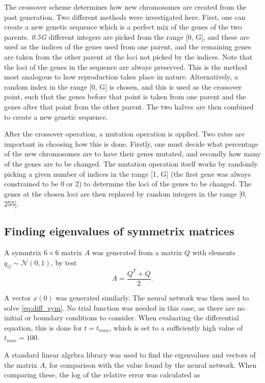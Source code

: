 \documentclass[multicolumn, 10pt]{extarticle}
\begin{document}
The crossover scheme determines how new chromosomes are created from the past generation. Two different methods were investigated here. First, one can create a new genetic sequence which is a perfect mix of the genes of the two parents. \textit{0.5G} different integers are picked from the range [0, G], and these are used as the indices of the genes used from one parent, and the remaining genes are taken from the other parent at the loci not picked by the indices. Note that the loci of the genes in the sequence are always preserved. This is the method most analogous to how reproduction takes place in nature. Alternatively, a random index in the range [0, G] is chosen, and this is used as the crossover point, such that the genes before that point is taken from one parent and the genes after that point from the other parent. The two halves are then combined to create a new genetic sequence.

After the crossover operation, a mutation operation is applied. Two rates are important in choosing how this is done. Firstly, one must decide what percentage of the new chromosomes are to have their genes mutated, and secondly how many of the genes are to be changed. The mutation operation itself works by randomly picking a given number of indices in the range [1, G] (the first gene was always constrained to be 0 or 2) to determine the loci of the genes to be changed. The genes at the chosen loci are then replaced by random integers in the range [0, 255].

\subsection{Finding eigenvalues of symmetrix matrices}
A symmtrix $6\times6$ matrix $A$ was generated from a matrix $Q$ with elements $q_{ij} \sim \mathcal{N}(0,1)$, by test
\begin{equation}\label{eq:symmat}
	A=\frac{Q^T+Q}{2}.
\end{equation}

A vector $x(0)$ was generated similarly. The neural network was then used to solve \eqref{eq:diff_sym}. No trial function was needed in this case, as there are no initial or boundary conditions to consider. When evaluating the differential equation, this is done for $t=t_{max}$, which is set to a sufficiently high value of $t_{max}=100$.

A standard linear algebra library was used to find the eigenvalues and vectors of the matrix $A$, for comparison with the value found by the neural network. When comparing these, the log of the relative error was calculated as
\end{document}
